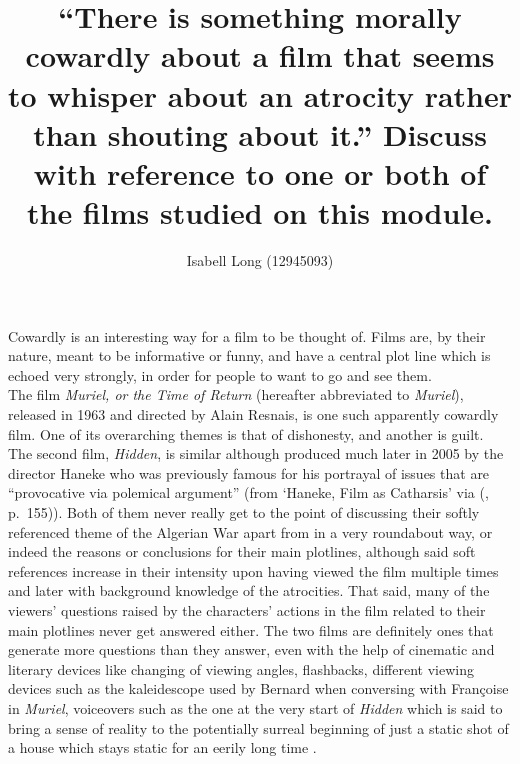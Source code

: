 \documentclass[12pt]{article}
\begin{document}
\title{``There is something morally cowardly about a film that seems to
         whisper about an atrocity rather than shouting about it.''
       Discuss with reference to one or both of the films studied on
       this module.}
\author{Isabell Long (12945093)}
\maketitle

Cowardly is an interesting way for a film to be thought of. Films are,
by their nature, meant to be informative or funny, and have a central
plot line which is echoed very strongly, in order for people to want
to go and see them.\\

The film \textit{Muriel, or the Time of Return} (hereafter abbreviated
to \textit{Muriel}), released in 1963 and directed by Alain Resnais,
is one such apparently cowardly film. One of its overarching themes is
that of dishonesty, and another is guilt. The second film,
\textit{Hidden}, is similar although produced much later in 2005 by
the director Haneke who was previously famous for his portrayal of
issues that are ``provocative via polemical argument'' (from `Haneke,
Film as Catharsis' via \citeauthor{on-haneke} (\citeyear{on-haneke},
p.\ 155)). Both of them never really get to the point of discussing
their softly referenced theme of the Algerian War apart from in a very
roundabout way, or indeed the reasons or conclusions for their main
plotlines, although said soft references increase in their intensity
upon having viewed the film multiple times and later with background
knowledge of the atrocities.  That said, many of the viewers'
questions raised by the characters' actions in the film related to
their main plotlines never get answered either.  The two films are
definitely ones that generate more questions than they answer, even
with the help of cinematic and literary devices like changing of
viewing angles, flashbacks, different viewing devices such as the
kaleidescope used by Bernard when conversing with Françoise in
\textit{Muriel}, voiceovers such as the one at the very start of
\textit{Hidden} which is said to bring a sense of reality to the
potentially surreal beginning of just a static shot of a house which
stays static for an eerily long time \citep{cache-meanings}.\\
\end{document}
